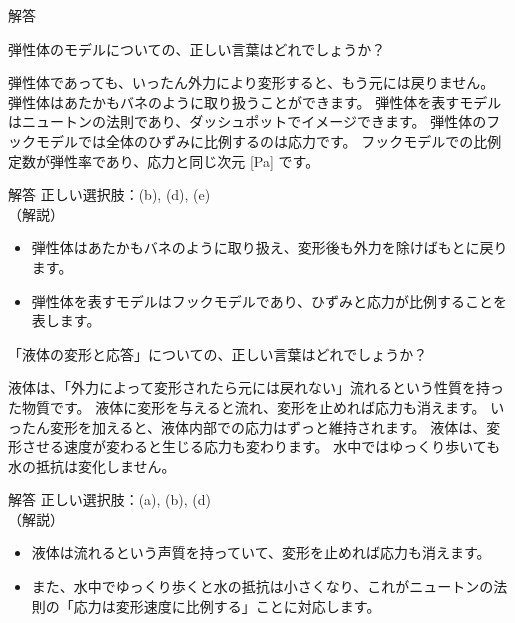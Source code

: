\documentclass[uplatex,dvipdfmx,a4paper,11pt]{jsarticle}
\begin{document}
\begin{qlist}
\begin{itembox}[l]{解答}
    \end{itembox}
	\qitem 弾性体のモデルについての、正しい言葉はどれでしょうか？
		\begin{qlist2}
			\qitem 弾性体であっても、いったん外力により変形すると、もう元には戻りません。
			\qitem 弾性体はあたかもバネのように取り扱うことができます。
			\qitem 弾性体を表すモデルはニュートンの法則であり、ダッシュポットでイメージできます。
			\qitem 弾性体のフックモデルでは全体のひずみに比例するのは応力です。
			\qitem フックモデルでの比例定数が弾性率であり、応力と同じ次元 [Pa] です。
		\end{qlist2}
    \vspace{3mm}
    \begin{itembox}[l]{解答}
        正しい選択肢：(b), (d), (e)\\
        （解説）
		\begin{itemize}
			\item 弾性体はあたかもバネのように取り扱え、変形後も外力を除けばもとに戻ります。
			\item 弾性体を表すモデルはフックモデルであり、ひずみと応力が比例することを表します。
		\end{itemize}
    \end{itembox}
	\qitem 「液体の変形と応答」についての、正しい言葉はどれでしょうか？
	\begin{qlist2}
		\qitem 液体は、「外力によって変形されたら元には戻れない」流れるという性質を持った物質です。
		\qitem 液体に変形を与えると流れ、変形を止めれば応力も消えます。
		\qitem いったん変形を加えると、液体内部での応力はずっと維持されます。
		\qitem 液体は、変形させる速度が変わると生じる応力も変わります。
		\qitem 水中ではゆっくり歩いても水の抵抗は変化しません。
	\end{qlist2}
  \vspace{3mm}
  \begin{itembox}[l]{解答}
    正しい選択肢：(a), (b), (d)\\
    （解説）
	\begin{itemize}
		\item 液体は流れるという声質を持っていて、変形を止めれば応力も消えます。
		\item また、水中でゆっくり歩くと水の抵抗は小さくなり、これがニュートンの法則の「応力は変形速度に比例する」ことに対応します。
	\end{itemize}


\end{itembox}
\end{qlist}
\end{document}
